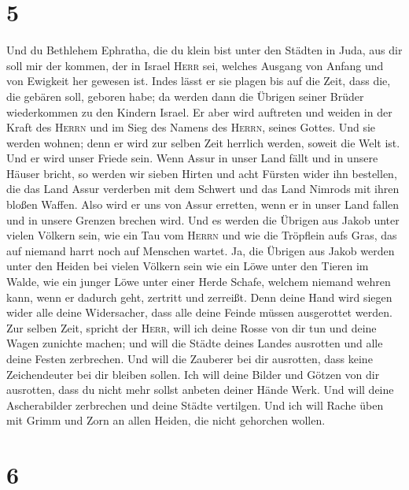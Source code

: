 \hypertarget{section-4}{%
\section{5}\label{section-4}}

 Und du Bethlehem Ephratha, die du klein bist unter den
Städten in Juda, aus dir soll mir der kommen, der in Israel
\textsc{Herr} sei, welches Ausgang von Anfang und von Ewigkeit her
gewesen ist.  Indes lässt er sie plagen bis auf die Zeit,
dass die, die gebären soll, geboren habe; da werden dann die Übrigen
seiner Brüder wiederkommen zu den Kindern Israel.  Er aber
wird auftreten und weiden in der Kraft des \textsc{Herrn} und im Sieg
des Namens des \textsc{Herrn}, seines Gottes. Und sie werden wohnen;
denn er wird zur selben Zeit herrlich werden, soweit die Welt ist.
 Und er wird unser Friede sein. Wenn Assur in unser Land
fällt und in unsere Häuser bricht, so werden wir sieben Hirten und acht
Fürsten wider ihn bestellen,  die das Land Assur verderben
mit dem Schwert und das Land Nimrods mit ihren bloßen Waffen. Also wird
er uns von Assur erretten, wenn er in unser Land fallen und in unsere
Grenzen brechen wird.  Und es werden die Übrigen aus Jakob
unter vielen Völkern sein, wie ein Tau vom \textsc{Herrn} und wie die
Tröpflein aufs Gras, das auf niemand harrt noch auf Menschen wartet.
 Ja, die Übrigen aus Jakob werden unter den Heiden bei
vielen Völkern sein wie ein Löwe unter den Tieren im Walde, wie ein
junger Löwe unter einer Herde Schafe, welchem niemand wehren kann, wenn
er dadurch geht, zertritt und zerreißt.  Denn deine Hand
wird siegen wider alle deine Widersacher, dass alle deine Feinde müssen
ausgerottet werden.  Zur selben Zeit, spricht der
\textsc{Herr}, will ich deine Rosse von dir tun und deine Wagen zunichte
machen;  und will die Städte deines Landes ausrotten und
alle deine Festen zerbrechen.  Und will die Zauberer bei
dir ausrotten, dass keine Zeichendeuter bei dir bleiben sollen.
 Ich will deine Bilder und Götzen von dir ausrotten, dass
du nicht mehr sollst anbeten deiner Hände Werk.  Und will
deine Ascherabilder zerbrechen und deine Städte vertilgen.
 Und ich will Rache üben mit Grimm und Zorn an allen
Heiden, die nicht gehorchen wollen.

\hypertarget{section-5}{%
\section{6}\label{section-5}}

